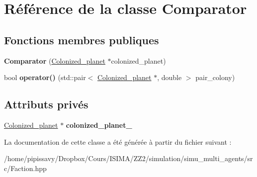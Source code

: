 \hypertarget{classComparator}{\section{Référence de la classe Comparator}
\label{classComparator}
}
\subsection*{Fonctions membres publiques}
\begin{DoxyCompactItemize}
\item 
\hypertarget{classComparator_aff716639b83e77e710f3c3175c4b43d0}{{\bfseries Comparator} (\hyperlink{classColonized__planet}{Colonized\-\_\-planet} $\ast$colonized\-\_\-planet)}\label{classComparator_aff716639b83e77e710f3c3175c4b43d0}

\item 
\hypertarget{classComparator_aa063882ba2357118b02cd4e01d807480}{bool {\bfseries operator()} (std\-::pair$<$ \hyperlink{classColonized__planet}{Colonized\-\_\-planet} $\ast$, double $>$ pair\-\_\-colony)}\label{classComparator_aa063882ba2357118b02cd4e01d807480}

\end{DoxyCompactItemize}
\subsection*{Attributs privés}
\begin{DoxyCompactItemize}
\item 
\hypertarget{classComparator_a5b42c2a1661147200983835ac36802cf}{\hyperlink{classColonized__planet}{Colonized\-\_\-planet} $\ast$ {\bfseries colonized\-\_\-planet\-\_\-}}\label{classComparator_a5b42c2a1661147200983835ac36802cf}

\end{DoxyCompactItemize}


La documentation de cette classe a été générée à partir du fichier suivant \-:\begin{DoxyCompactItemize}
\item 
/home/pipissavy/\-Dropbox/\-Cours/\-I\-S\-I\-M\-A/\-Z\-Z2/simulation/simu\-\_\-multi\-\_\-agents/src/Faction.\-hpp\end{DoxyCompactItemize}
